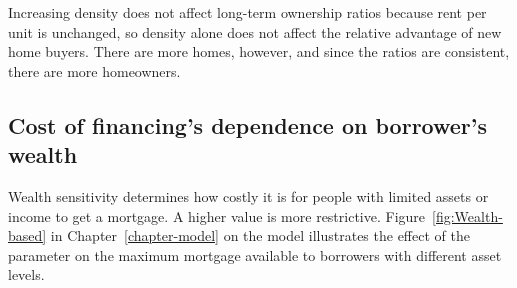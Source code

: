 Increasing density does not affect long-term ownership ratios because rent per unit is unchanged, so density alone does not affect the relative advantage of new home buyers. %
There are more homes, however, and since the ratios are consistent, there are more homeowners. %

\newpage

\subsection{Cost of financing's dependence on borrower's wealth}

Wealth sensitivity %
determines how costly it is for people with limited assets or income to get a mortgage. A higher value is more restrictive. Figure~\ref{fig:Wealth-based} in Chapter~\ref{chapter-model} on the model illustrates the effect of the parameter on the maximum mortgage available to borrowers with different asset levels.%

